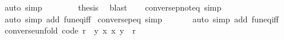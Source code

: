 \begin{isabellebody}
\ {\isacharparenleft}{\kern0pt}auto\ simp{\isacharcolon}{\kern0pt}\ {\isacharasterisk}{\kern0pt}{\isacharparenright}{\kern0pt}\isanewline
\ \ \isacommand{{\isacharbraceright}{\kern0pt}}\isamarkupfalse%
\ \isamarkupfalse%
\ \isamarkupfalse%
\ {\isacharquery}{\kern0pt}thesis\ \isamarkupfalse%
\ blast\isanewline
{}\isamarkupfalse%
%
\endisatagproof
{\isafoldproof}%
%
\isadelimproof
\ \ \isanewline
%
\endisadelimproof
\isanewline
{}\isamarkupfalse%
\ conversep{\isacharunderscore}{\kern0pt}noteq\ {\isacharbrackleft}{\kern0pt}simp{\isacharbrackright}{\kern0pt}{\isacharcolon}{\kern0pt}\ {\isachardoublequoteopen}{\isacharparenleft}{\kern0pt}{\isasymnoteq}{\isacharparenright}{\kern0pt}{\isasyminverse}{\isasyminverse}\ {\isacharequal}{\kern0pt}\ {\isacharparenleft}{\kern0pt}{\isasymnoteq}{\isacharparenright}{\kern0pt}{\isachardoublequoteclose}\isanewline
%
\isadelimproof
\ \ %
\endisadelimproof
%
\isatagproof
{}\isamarkupfalse%
\ {\isacharparenleft}{\kern0pt}auto\ simp\ add{\isacharcolon}{\kern0pt}\ fun{\isacharunderscore}{\kern0pt}eq{\isacharunderscore}{\kern0pt}iff{\isacharparenright}{\kern0pt}%
\endisatagproof
{\isafoldproof}%
%
\isadelimproof
\isanewline
%
\endisadelimproof
\isanewline
{}\isamarkupfalse%
\ conversep{\isacharunderscore}{\kern0pt}eq\ {\isacharbrackleft}{\kern0pt}simp{\isacharbrackright}{\kern0pt}{\isacharcolon}{\kern0pt}\ {\isachardoublequoteopen}{\isacharparenleft}{\kern0pt}{\isacharequal}{\kern0pt}{\isacharparenright}{\kern0pt}{\isasyminverse}{\isasyminverse}\ {\isacharequal}{\kern0pt}\ {\isacharparenleft}{\kern0pt}{\isacharequal}{\kern0pt}{\isacharparenright}{\kern0pt}{\isachardoublequoteclose}\isanewline
%
\isadelimproof
\ \ %
\endisadelimproof
%
\isatagproof
{}\isamarkupfalse%
\ {\isacharparenleft}{\kern0pt}auto\ simp\ add{\isacharcolon}{\kern0pt}\ fun{\isacharunderscore}{\kern0pt}eq{\isacharunderscore}{\kern0pt}iff{\isacharparenright}{\kern0pt}%
\endisatagproof
{\isafoldproof}%
%
\isadelimproof
\isanewline
%
\endisadelimproof
\isanewline
{}\isamarkupfalse%
\ converse{\isacharunderscore}{\kern0pt}unfold\ {\isacharbrackleft}{\kern0pt}code{\isacharbrackright}{\kern0pt}{\isacharcolon}{\kern0pt}\ {\isachardoublequoteopen}r{\isasyminverse}\ {\isacharequal}{\kern0pt}\ {\isacharbraceleft}{\kern0pt}{\isacharparenleft}{\kern0pt}y{\isacharcomma}{\kern0pt}\ x{\isacharparenright}{\kern0pt}{\isachardot}{\kern0pt}\ {\isacharparenleft}{\kern0pt}x{\isacharcomma}{\kern0pt}\ y{\isacharparenright}{\kern0pt}\ {\isasymin}\ r{\isacharbraceright}{\kern0pt}{\isachardoublequoteclose}\isanewline

\end{isabellebody}
